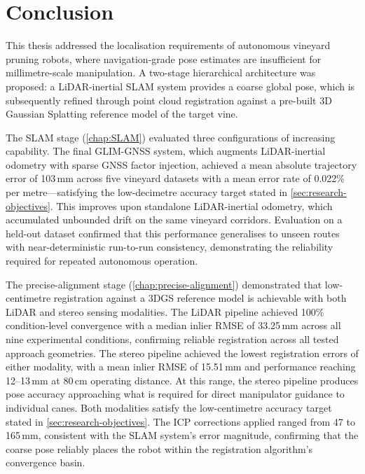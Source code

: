 \chapter{Conclusion}
\label{chap:Conclusion}

This thesis addressed the localisation requirements of autonomous vineyard pruning robots, where navigation-grade pose estimates are insufficient for millimetre-scale manipulation. A two-stage hierarchical architecture was proposed: a LiDAR-inertial SLAM system provides a coarse global pose, which is subsequently refined through point cloud registration against a pre-built 3D Gaussian Splatting reference model of the target vine.

The SLAM stage (\cref{chap:SLAM}) evaluated three configurations of increasing capability. The final GLIM-GNSS system, which augments LiDAR-inertial odometry with sparse GNSS factor injection, achieved a mean absolute trajectory error of 103\,mm across five vineyard datasets with a mean error rate of 0.022\% per metre---satisfying the low-decimetre accuracy target stated in \cref{sec:research-objectives}. This improves upon standalone LiDAR-inertial odometry, which accumulated unbounded drift on the same vineyard corridors. Evaluation on a held-out dataset confirmed that this performance generalises to unseen routes with near-deterministic run-to-run consistency, demonstrating the reliability required for repeated autonomous operation.

The precise-alignment stage (\cref{chap:precise-alignment}) demonstrated that low-centimetre registration against a 3DGS reference model is achievable with both LiDAR and stereo sensing modalities. The LiDAR pipeline achieved 100\% condition-level convergence with a median inlier RMSE of 33.25\,mm across all nine experimental conditions, confirming reliable registration across all tested approach geometries. The stereo pipeline achieved the lowest registration errors of either modality, with a mean inlier RMSE of 15.51\,mm and performance reaching 12--13\,mm at 80\,cm operating distance. At this range, the stereo pipeline produces pose accuracy approaching what is required for direct manipulator guidance to individual canes. Both modalities satisfy the low-centimetre accuracy target stated in \cref{sec:research-objectives}. The ICP corrections applied ranged from 47 to 165\,mm, consistent with the SLAM system's error magnitude, confirming that the coarse pose reliably places the robot within the registration algorithm's convergence basin.

